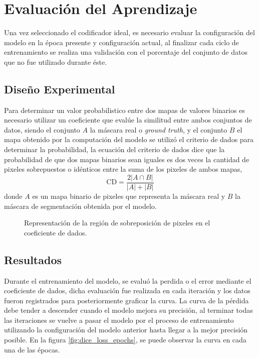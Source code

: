 \clearpage

\section{Evaluación del Aprendizaje}
Una vez seleccionado el codificador ideal, es necesario evaluar la configuración del modelo en la época presente y configuración actual, al finalizar cada ciclo de entrenamiento se realiza una validación con el porcentaje del conjunto de datos que no fue utilizado durante éste.
\subsection{Diseño Experimental}
Para determinar un valor probabilistico entre dos mapas de valores binarios es necesario utilizar un coeficiente que evalúe la similitud entre ambos conjuntos de datos, siendo el conjunto $A$ la máscara real o \emph{ground truth}, y el conjunto $B$ el mapa obtenido por la computación del modelo se utilizó el criterio de dados para determinar la probabilidad, la ecuación del criterio de dados dice que la probabilidad de que dos mapas binarios sean iguales es dos veces la cantidad de pixeles sobrepuestos o idénticos entre la suma de los pixeles de ambos mapas, 
\begin{equation}\label{eq:diceloss}
    \text{CD} = \frac{2|A \cap B |}{|A| + |B|}
\end{equation}
donde $A$ es un mapa binario de pixeles que representa la máscara real y $B$ la máscara de segmentación obtenida por el modelo.

\def\firstcircle{(0,0) circle (1.5cm)}
\def\secondcircle{(2,0) circle (1.5cm)}
\def\thirdcircle{(0:2cm) circle (1.5cm)}

\begin{figure}[!h]
    \centering
    \caption{Representación de la región de sobreposición de pixeles en el coeficiente de dados.}
\end{figure}

\subsection{Resultados}
Durante el entrenamiento del modelo, se evaluó la perdida o el error mediante el coeficiente de dados, dicha evaluación fue realizada en cada iteración y los datos fueron registrados para posteriormente graficar la curva. La curva de la pérdida debe tender a descender cuando el modelo mejora su precisión, al terminar todas las iteraciones se vuelve a pasar el modelo por el proceso de entrenamiento utilizando la configuración del modelo anterior hasta llegar a la mejor precisión posible. En la figura \ref{fig:dice_loss_epochs}, se puede observar la curva en cada una de las épocas.


